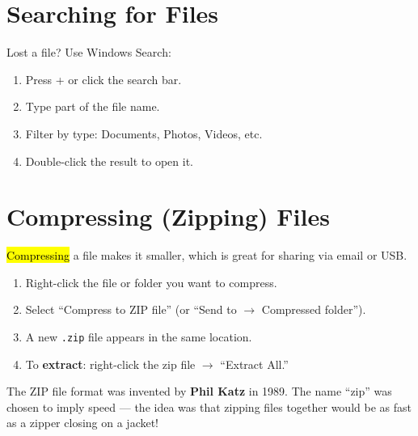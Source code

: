 \section{Searching for Files}
\label{sec:search-files}

Lost a file? Use Windows Search:
\begin{enumerate}[label=\protect\stepcircle{\arabic*}, leftmargin=2cm, itemsep=3pt]
  \item Press + or click the search bar.
  \item Type part of the file name.
  \item Filter by type: Documents, Photos, Videos, etc.
  \item Double-click the result to open it.
\end{enumerate}

\section{Compressing (Zipping) Files}
\label{sec:zip}

\hl{Compressing} a file makes it smaller, which is great for sharing via email or USB.

\begin{labstep}
\begin{enumerate}[label=\protect\stepcircle{\arabic*}, leftmargin=2cm, itemsep=3pt]
  \item Right-click the file or folder you want to compress.
  \item Select ``Compress to ZIP file'' (or ``Send to $\rightarrow$ Compressed folder'').
  \item A new \texttt{.zip} file appears in the same location.
  \item To \textbf{extract}: right-click the zip file $\rightarrow$ ``Extract All.''
\end{enumerate}
\end{labstep}


\begin{funfact}
The ZIP file format was invented by \textbf{Phil Katz} in 1989. The name ``zip'' was chosen to imply speed --- the idea was that zipping files together would be as fast as a zipper closing on a jacket!
\end{funfact}

